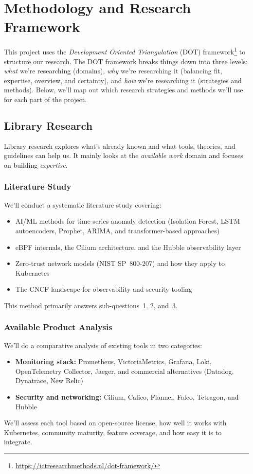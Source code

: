 \chapter{Methodology and Research Framework}
\label{chapter:methodology}

This project uses the \emph{Development Oriented Triangulation} (DOT) framework\footnote{\url{https://ictresearchmethods.nl/dot-framework/}} to structure our research. The DOT framework breaks things down into three levels: \emph{what} we're researching (domains), \emph{why} we're researching it (balancing fit, expertise, overview, and certainty), and \emph{how} we're researching it (strategies and methods). Below, we'll map out which research strategies and methods we'll use for each part of the project.

\section{Library Research}

Library research explores what's already known and what tools, theories, and guidelines can help us. It mainly looks at the \emph{available work} domain and focuses on building \emph{expertise}.

\subsection{Literature Study}
We'll conduct a systematic literature study covering:
\begin{itemize}
    \item AI/ML methods for time-series anomaly detection (Isolation Forest, LSTM autoencoders, Prophet, ARIMA, and transformer-based approaches)
    \item eBPF internals, the Cilium architecture, and the Hubble observability layer
    \item Zero-trust network models (NIST SP~800-207) and how they apply to Kubernetes
    \item The CNCF landscape for observability and security tooling
\end{itemize}
This method primarily answers sub-questions~1, 2, and~3.

\subsection{Available Product Analysis}
We'll do a comparative analysis of existing tools in two categories:
\begin{itemize}
    \item \textbf{Monitoring stack:} Prometheus, VictoriaMetrics, Grafana, Loki, OpenTelemetry Collector, Jaeger, and commercial alternatives (Datadog, Dynatrace, New Relic)
    \item \textbf{Security and networking:} Cilium, Calico, Flannel, Falco, Tetragon, and Hubble
\end{itemize}
We'll assess each tool based on open-source license, how well it works with Kubernetes, community maturity, feature coverage, and how easy it is to integrate.

